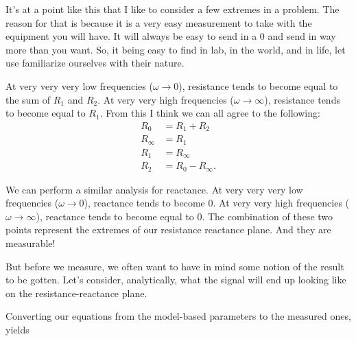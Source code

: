 \documentclass[11pt]{book}
\begin{document}
It's at a point like this that I like to consider a few extremes in a problem. The reason for that is because it is a very easy measurement to take with the equipment you will have. It will always be easy to send in a 0 and send in way more than you want. So, it being easy to find in lab, in the world, and in life, let use familiarize ourselves with their nature.

At very very very low frequencies ($\omega \rightarrow 0$), resistance tends to become equal to the sum of $R_1$ and $R_2$. At very very high frequencies ($\omega \rightarrow \infty$), resistance tends to become equal to $R_1$. From this I think we can all agree to the following:
\begin{align}
	R_0 &= R_1 + R_2 \\
	R_{\infty} &= R_1 \\
	R_1 &= R_{\infty} \\
	R_2 &= R_0 - R_{\infty}.
\end{align}

We can perform a similar analysis for reactance. At very very very low frequencies ($\omega \rightarrow 0$), reactance tends to become 0. At very very high frequencies ($\omega \rightarrow \infty$), reactance tends to become equal to 0. The combination of these two points represent the extremes of our resistance reactance plane. And they are measurable!

But before we measure, we often want to have in mind some notion of the result to be gotten. Let's consider, analytically, what the signal will end up looking like on the resistance-reactance plane.

Converting our equations from the model-based parameters to the measured ones, yields
\end{document}
